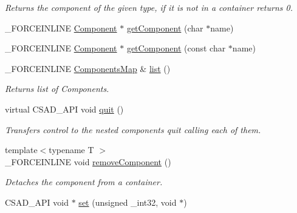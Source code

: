 \begin{DoxyCompactItemize}
\begin{DoxyCompactList}\small\item\em Returns the component of the given type, if it is not in a container returns 0. \end{DoxyCompactList}\item 
\-\_\-\-F\-O\-R\-C\-E\-I\-N\-L\-I\-N\-E \hyperlink{classcsad_1_1_component}{Component} $\ast$ \hyperlink{classcsad_1_1_container_components_a20e87b5dd1fb810997100f82c5da715d}{get\-Component} (char $\ast$name)
\item 
\-\_\-\-F\-O\-R\-C\-E\-I\-N\-L\-I\-N\-E \hyperlink{classcsad_1_1_component}{Component} $\ast$ \hyperlink{classcsad_1_1_container_components_ab3b09a7785fe6f0931f174c50912e52e}{get\-Component} (const char $\ast$name)
\item 
\hypertarget{classcsad_1_1_container_components_a48f1bed785f23be756a477ed638fa3b5}{\-\_\-\-F\-O\-R\-C\-E\-I\-N\-L\-I\-N\-E \hyperlink{classbt_1_1_map_void}{Components\-Map} \& \hyperlink{classcsad_1_1_container_components_a48f1bed785f23be756a477ed638fa3b5}{list} ()}\label{classcsad_1_1_container_components_a48f1bed785f23be756a477ed638fa3b5}

\begin{DoxyCompactList}\small\item\em Returns list of Components. \end{DoxyCompactList}\item 
\hypertarget{classcsad_1_1_container_components_a2cdd24762a2fcf66fab366172bff6527}{virtual C\-S\-A\-D\-\_\-\-A\-P\-I void \hyperlink{classcsad_1_1_container_components_a2cdd24762a2fcf66fab366172bff6527}{quit} ()}\label{classcsad_1_1_container_components_a2cdd24762a2fcf66fab366172bff6527}

\begin{DoxyCompactList}\small\item\em Transfers control to the nested components quit calling each of them. \end{DoxyCompactList}\item 
\hypertarget{classcsad_1_1_container_components_ad28a786b0fa5089944ec7335e5358951}{{\footnotesize template$<$typename T $>$ }\\\-\_\-\-F\-O\-R\-C\-E\-I\-N\-L\-I\-N\-E void \hyperlink{classcsad_1_1_container_components_ad28a786b0fa5089944ec7335e5358951}{remove\-Component} ()}\label{classcsad_1_1_container_components_ad28a786b0fa5089944ec7335e5358951}

\begin{DoxyCompactList}\small\item\em Detaches the component from a container. \end{DoxyCompactList}\item 
\hypertarget{classcsad_1_1_container_components_a5e464c03fe5ea072f7887ff839831fe8}{C\-S\-A\-D\-\_\-\-A\-P\-I void $\ast$ \hyperlink{classcsad_1_1_container_components_a5e464c03fe5ea072f7887ff839831fe8}{set} (unsigned \-\_\-int32, void $\ast$)}\label{classcsad_1_1_container_components_a5e464c03fe5ea072f7887ff839831fe8}


\end{DoxyCompactItemize}
